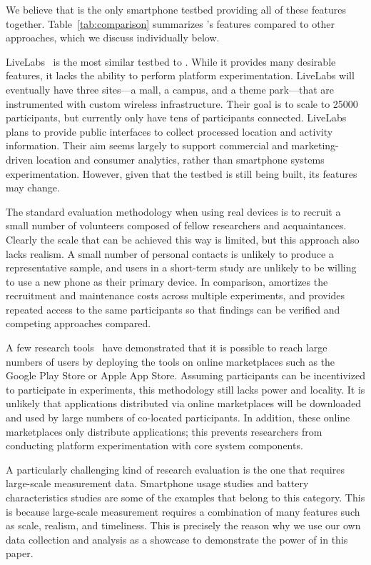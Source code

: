 We believe that \PhoneLab{} is the only smartphone testbed providing all of
these features together. Table~\ref{tab:comparison} summarizes \PhoneLab{}'s
features compared to other approaches, which we discuss individually below.

LiveLabs~\cite{livelabs} is the most similar testbed to \PhoneLab{}. While it
provides many desirable features, it lacks the ability to perform platform
experimentation. LiveLabs will eventually have three sites---a mall, a
campus, and a theme park---that are instrumented with custom wireless
infrastructure. Their goal is to scale to \num{25000} participants, but
currently only have tens of participants connected. LiveLabs plans to provide
public interfaces to collect processed location and activity information.
Their aim seems largely to support commercial and marketing-driven location
and consumer analytics, rather than smartphone systems experimentation.
However, given that the testbed is still being built, its features may
change.

The standard evaluation methodology when using real devices is to recruit a
small number of volunteers composed of fellow researchers and acquaintances.
Clearly the scale that can be achieved this way is limited, but this approach
also lacks realism. A small number of personal contacts is unlikely to
produce a representative sample, and users in a short-term study are unlikely
to be willing to use a new phone as their primary device. In comparison,
\PhoneLab{} amortizes the recruitment and maintenance costs across multiple
experiments, and provides repeated access to the same participants so that
findings can be verified and competing approaches compared.

A few research tools~\cite{huang:mobisys:2010, zhang:codes:2010} have
demonstrated that it is possible to reach large numbers of users by deploying
the tools on online marketplaces such as the Google Play Store or Apple App
Store. Assuming participants can be incentivized to participate in experiments,
this methodology still lacks power and locality. It is unlikely that
applications distributed via online marketplaces will be downloaded and used by
large numbers of co-located participants. In addition, these online marketplaces
only distribute applications; this prevents researchers from conducting platform
experimentation with core system components.

A particularly challenging kind of research evaluation is the one that requires
large-scale measurement data. Smartphone usage studies and battery
characteristics studies are some of the examples that belong to this category.
This is because large-scale measurement requires a combination of many features
such as scale, realism, and timeliness. This is precisely the reason why we use
our own data collection and analysis as a showcase to demonstrate the power of
\PhoneLab{} in this paper.

